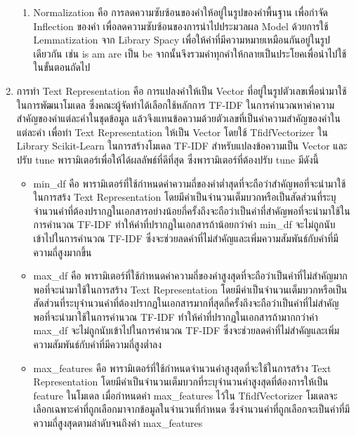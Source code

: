 \documentclass[12pt,oneside,openright,a4paper]{cpe-thai-project}
\begin{document}
\begin{enumerate}
\begin{enumerate}
            \item Normalization คือ การลดความซับซ้อนของคำให้อยู่ในรูปของคำพื้นฐาน เพื่อกำจัด Inflection ของคำ 
            เพื่อลดความซับซ้อนของการนำไปประมวลผล Model ด้วยการใช้ Lemmatization จาก Library Spacy 
            เพื่อให้คำที่มีความหมายเหมือนกันอยู่ในรูปเดียวกัน เช่น is am are เป็น be จากนั้นจึงรวมคำทุกคำให้กลายเป็นประโยคเพื่อนำไปใช้ในขั้นตอนถัดไป
          \end{enumerate}
    \item การทำ Text Representation คือ การแปลงคำให้เป็น Vector ที่อยู่ในรูปตัวเลขเพื่อนำมาใช้ในการพัฒนาโมเดล 
          ซึ่งคณะผู้จัดทำได้เลือกใช้หลักการ TF-IDF ในการคำนวณหาค่าความสำคัญของคำแต่ละคำในชุดข้อมูล
          แล้วจึงแทนข้อความด้วยตัวเลขที่เป็นค่าความสำคัญของคำในแต่ละคำ เพื่อทำ Text Representation ให้เป็น Vector
          โดยใช้ TfidfVectorizer ใน Library Scikit-Learn ในการสร้างโมเดล TF-IDF สำหรับแปลงข้อความเป็น Vector 
          และปรับ tune พารามิเตอร์เพื่อให้ได้ผลลัพธ์ที่ดีที่สุด ซึ่งพารามิเตอร์ที่ต้องปรับ tune มีดังนี้
          \begin{itemize}
            \item min\_df คือ พารามิเตอร์ที่ใช้กำหนดค่าความถี่ของคำต่ำสุดที่จะถือว่าสำคัญพอที่จะนำมาใช้ในการสร้ง Text Representation 
                  โดยมีค่าเป็นจำนวนเต็มบวกหรือเป็นสัดส่วนที่ระบุจำนวนคำที่ต้องปรากฏในเอกสารอย่างน้อยกี่ครั้งถึงจะถือว่าเป็นคำที่สำคัญพอที่จะนำมาใช้ในการคำนวณ TF-IDF
                  ทำให้คำที่ปรากฏในเอกสารถ้าน้อยกว่าค่า min\_df จะไม่ถูกนับเข้าไปในการคำนวณ TF-IDF ซึ่งจะช่วยลดคำที่ไม่สำคัญและเพิ่มความสัมพันธ์กับคำที่มีความถี่สูงมากขึ้น
            \item max\_df คือ พารามิเตอร์ที่ใช้กำหนดค่าความถี่ของคำสูงสุดที่จะถือว่าเป็นคำที่ไม่สำคัญมากพอที่จะนำมาใช้ในการสร้าง Text Representation 
                  โดยมีค่าเป็นจำนวนเต็มบวกหรือเป็นสัดส่วนที่ระบุจำนวนคำที่ต้องปรากฏในเอกสารมากที่สุดกี่ครั้งถึงจะถือว่าเป็นคำที่ไม่สำคัญพอที่จะนำมาใช้ในการคำนวณ TF-IDF
                  ทำให้คำที่ปรากฏในเอกสารถ้ามากกว่าค่า max\_df จะไม่ถูกนับเข้าไปในการคำนวณ TF-IDF ซึ่งจะช่วยลดคำที่ไม่สำคัญและเพิ่มความสัมพันธ์กับคำที่มีความถี่สูงต่ำลง
            \item max\_features คือ พารามิเตอร์ที่ใช้กำหนดจำนวนคำสูงสุดที่จะใช้ในการสร้าง Text Representation 
                  โดยมีค่าเป็นจำนวนเต็มบวกที่ระบุจำนวนคำสูงสุดที่ต้องการให้เป็น feature ในโมเดล
                  เมื่อกำหนดค่า max\_features ไว้ใน TfidfVectorizer โมเดลจะเลือกเฉพาะคำที่ถูกเลือกมาจากข้อมูลในจำนวนที่กำหนด 
                  ซึ่งจำนวนคำที่ถูกเลือกจะเป็นคำที่มีความถี่สูงสุดตามลำดับจนถึงค่า max\_features

\end{itemize}
\end{enumerate}
\end{document}
